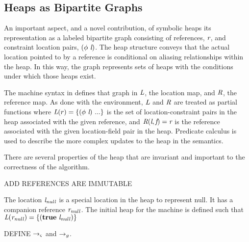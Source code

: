 \subsection{Heaps as Bipartite Graphs}
An important aspect, and a novel contribution, of symbolic heaps its
representation as a labeled bipartite graph consisting of
references, $\emph{r}$, and constraint location pairs,
$(\phi\ \emph{l})$. The heap structure conveys that the actual
location pointed to by a reference is conditional on aliasing
relationships within the heap. In this way, the graph represents sets
of heaps with the conditions under which those heaps exist.

The machine syntax in  defines that graph
in $\emph{L}$, the location map, and $\emph{R}$, the reference
map. As done with the environment, $\emph{L}$ and $\emph{R}$ are
treated as partial functions where $\emph{L}(r) =
\{(\phi\ \emph{l})\ ...\}$ is the set of location-constraint pairs in
the heap associated with the given reference, and
$\emph{R}(\emph{l},\emph{f}) = \emph{r}$ is the reference
associated with the given location-field pair in the heap. Predicate
calculus is used to describe the more complex updates to the heap in
the semantics.

There are several properties of the heap that are invariant and
important to the correctness of the algorithm.
\begin{compactitem}
\item ADD REFERENCES ARE IMMUTABLE
\end{compactitem}

The location $\emph{l}_\mathit{null}$ is a special location in the
heap to represent null. It has a companion reference
$\emph{r}_\mathit{null}$. The initial heap for the machine is defined
such that $\emph{L}(\emph{r}_\mathit{null}) =
\{(\textbf{true}\ \emph{l}_\mathit{null})\}$

DEFINE $\rightarrow_{\varsigma}$ and $\rightarrow_{g}$.
